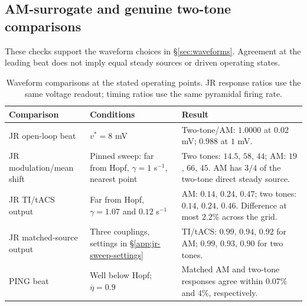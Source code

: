 \documentclass[11pt,a4paper]{article}
\begin{document}
\fi
\subsection{AM-surrogate and genuine two-tone comparisons}\label{supp:waveform-checks}
These checks support the waveform choices in \S\ref{sec:waveforms}. Agreement
at the leading beat does not imply equal steady sources or driven operating states.

\begin{table}[htbp]\centering\small
\caption{Waveform comparisons at the stated operating points. JR response ratios
use the same voltage readout; timing ratios use the same pyramidal firing rate.}
\label{tab:waveform-checks}
\begin{tabular}{@{}p{4.3cm}p{4.5cm}p{6cm}@{}}
\toprule
Comparison & Conditions & Result\\
\midrule
JR open-loop beat & $v^*=8$ mV & Two-tone/AM: $1.0000$ at $0.02$ mV; $0.988$ at $1$ mV.\\
JR modulation/mean shift & Pinned sweep: far from Hopf, $\gamma=1$ s$^{-1}$, nearest point & Two tones: $14.5$, $58$, $44$; AM: $19$, $66$, $45$. AM has $3/4$ of the two-tone direct steady source.\\
JR TI/tACS output & Far from Hopf, $\gamma=1.07$ and $0.12$ s$^{-1}$ & AM: $0.14$, $0.24$, $0.47$; two tones: $0.14$, $0.24$, $0.46$. Difference at most $2.2\%$ across the grid.\\
JR matched-source output & Three couplings, settings in \S\ref{app:jr-sweep-settings} & TI/tACS: $0.99$, $0.94$, $0.92$ for AM; $0.99$, $0.93$, $0.90$ for two tones.\\
PING beat & Well below Hopf; $\bar\eta=0.9$ & Matched AM and two-tone responses agree within $0.07\%$ and $4\%$, respectively.\\
\bottomrule
\end{tabular}
\end{table}
\end{document}
